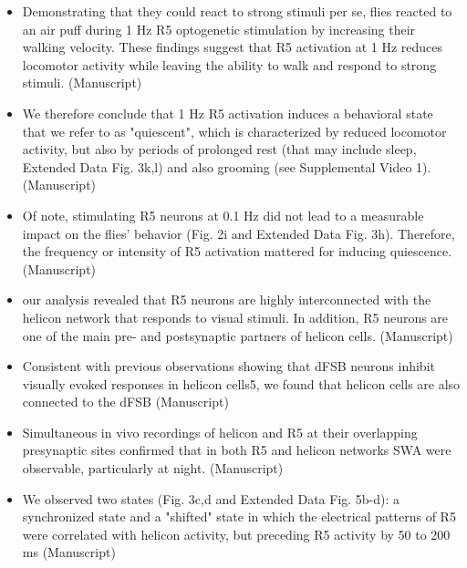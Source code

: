 \documentclass[11pt]{article}
\begin{document}
\begin{itemize}
    \item Demonstrating that they could react to strong stimuli per se, flies
    reacted to an air puff during 1 Hz R5 optogenetic stimulation by increasing their walking velocity.
    These findings suggest that R5 activation at 1 Hz reduces locomotor activity
    while leaving the ability to walk and respond to strong stimuli. 
    \cite{raccugliaCoherentMultilevelNetwork2022} (Manuscript)

    \item We therefore conclude that 1
    Hz R5 activation induces a behavioral state that we refer to as "quiescent", which is
    characterized by reduced locomotor activity, but also by periods of prolonged rest (that may
    include sleep, Extended Data Fig. 3k,l) and also grooming (see Supplemental Video 1).
    \cite{raccugliaCoherentMultilevelNetwork2022} (Manuscript)

    \item Of note, stimulating R5 neurons at 0.1 Hz did not lead to a
    measurable impact on the flies’ behavior (Fig. 2i and Extended Data Fig. 3h). Therefore, the
    frequency or intensity of R5 activation mattered for inducing quiescence.
    \cite{raccugliaCoherentMultilevelNetwork2022} (Manuscript)

    \item our analysis revealed that R5 neurons are highly interconnected with the helicon network that
    responds to visual stimuli. In addition, R5 neurons are one of the main pre- and
    postsynaptic partners of helicon cells.
    \cite{raccugliaCoherentMultilevelNetwork2022} (Manuscript)

    \item Consistent with previous
    observations showing that dFSB neurons inhibit visually evoked responses in helicon cells5, we
    found that helicon cells are also connected to the dFSB
    \cite{raccugliaCoherentMultilevelNetwork2022} (Manuscript)

    \item Simultaneous in vivo recordings of helicon and R5
    at their overlapping presynaptic sites confirmed that in both R5 and helicon networks SWA
    were observable, particularly at night.
    \cite{raccugliaCoherentMultilevelNetwork2022} (Manuscript)

    \item We observed two states (Fig. 3c,d and Extended Data Fig. 5b-d): a synchronized state and a
    "shifted" state in which the electrical patterns of R5 were correlated with helicon activity, but
    preceding R5 activity by 50 to 200 ms
    \cite{raccugliaCoherentMultilevelNetwork2022} (Manuscript)


\end{itemize}
\end{document}

